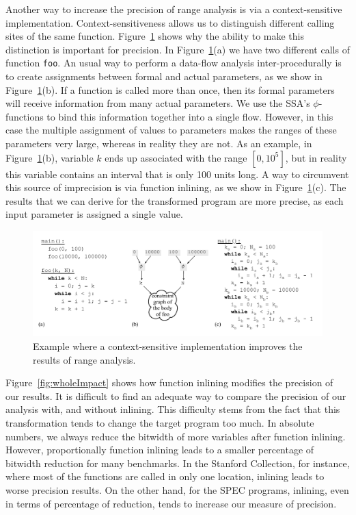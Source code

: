 \documentclass{llncs}
\begin{document}
Another way to increase the precision of range analysis is via a
context-sensitive implementation.
Context-sensitiveness allows us to distinguish different calling sites of
the same function.
Figure~\ref{fig:context} shows why the ability to make this distinction is
important for precision.
In Figure~\ref{fig:context}(a) we have two different calls of function
\texttt{foo}.
An usual way to perform a data-flow analysis inter-procedurally is to
create assignments between formal and actual parameters, as we show in
Figure~\ref{fig:context}(b).
If a function is called more than once, then its formal parameters will receive
information from many actual parameters.
We use the SSA's $\phi$-functions to bind this information together into a single
flow.
However, in this case the multiple assignment of values to parameters
makes the ranges of these parameters very large, whereas in reality they
are not.
As an example, in Figure~\ref{fig:context}(b), variable $k$ ends up
associated with the range $[0, 10^5]$, but in reality this variable contains
an interval that is only 100 units long.
A way to circumvent this source of imprecision is via function inlining,
as we show in Figure~\ref{fig:context}(c).
The results that we can derive for the transformed program are more
precise, as each input parameter is assigned a single value.

\begin{figure}[t!]
\begin{center}
\includegraphics[width=\textwidth]{images/context}
\end{center}
\caption{\label{fig:context}
Example where a context-sensitive implementation improves the results of
range analysis.
}
\end{figure}

Figure~\ref{fig:wholeImpact} shows how function inlining modifies the
precision of our results.
It is difficult to find an adequate way to compare the precision of
our analysis with, and without inlining.
This difficulty stems from the fact that this transformation tends to change
the target program too much.
In absolute numbers, we always reduce the bitwidth of more variables after
function inlining.
However, proportionally function inlining leads to a smaller percentage of
bitwidth reduction for many benchmarks.
In the Stanford Collection, for instance, where most of the functions are
called in only one location, inlining leads to worse precision results.
On the other hand, for the SPEC programs, inlining, even in terms of
percentage of reduction, tends to increase our measure of precision.
\end{document}
